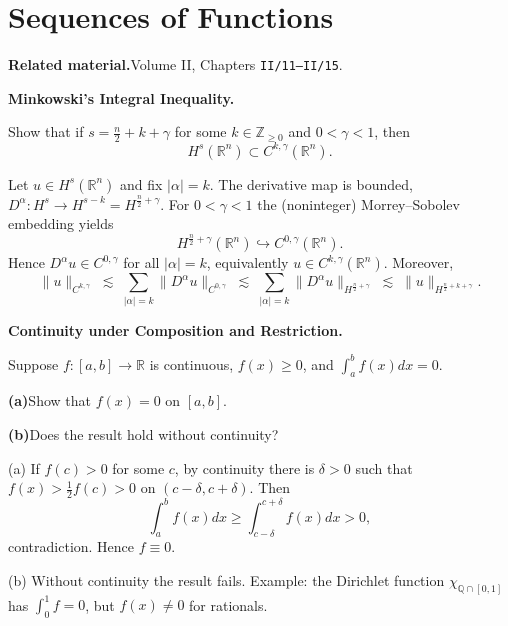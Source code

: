 \section{Sequences of Functions}

\par\medskip\noindent\textbf{Related material.}\quad  Volume II, Chapters \texttt{II/11--II/15}.

\begin{problem}[CP-II-0001]
\label{prob:cp-ii-0001}
\textbf{Minkowski's Integral Inequality.}

\hspace*{1.5em}Show that if $s=\frac n2+k+\gamma$ for some $k\in\mathbb Z_{\ge0}$ and $0<\gamma<1$, then
\[
H^s(\mathbb R^n)\subset C^{k,\gamma}(\mathbb R^n).
\]
\end{problem}

\begin{solution}
Let $u\in H^s(\mathbb R^n)$ and fix $|\alpha|=k$. The derivative map is bounded,
$D^\alpha:H^s\to H^{s-k}=H^{\frac n2+\gamma}$. For $0<\gamma<1$ the (noninteger) Morrey--Sobolev embedding yields
\[
H^{\frac n2+\gamma}(\mathbb R^n)\hookrightarrow C^{0,\gamma}(\mathbb R^n).
\]
Hence $D^\alpha u\in C^{0,\gamma}$ for all $|\alpha|=k$, equivalently $u\in C^{k,\gamma}(\mathbb R^n)$.
Moreover,
\[
\|u\|_{C^{k,\gamma}}\;\lesssim\;\sum_{|\alpha|=k}\|D^\alpha u\|_{C^{0,\gamma}}
\;\lesssim\;\sum_{|\alpha|=k}\|D^\alpha u\|_{H^{\frac n2+\gamma}}
\;\lesssim\;\|u\|_{H^{\frac n2+k+\gamma}}.
\]

\bigskip
\bigskip
\end{solution}

\begin{problem}[CP-II-0002]
\label{prob:cp-ii-0002}
\textbf{Continuity under Composition and Restriction.}

\hspace*{1.5em}Suppose $f:[a,b]\to\mathbb{R}$ is continuous, $f(x)\geq 0$, and $\int_a^b f(x)dx=0$.

	\par\smallskip\noindent\textbf{(a)}\quad Show that $f(x)=0$ on $[a,b]$.
	\par\smallskip\noindent\textbf{(b)}\quad Does the result hold without continuity?
\end{problem}

\begin{solution}
(a) If $f(c)>0$ for some $c$, by continuity there is $\delta>0$ such that $f(x)>\tfrac12 f(c)>0$ on $(c-\delta,c+\delta)$. Then
	\[
	\int_a^b f(x)dx\geq \int_{c-\delta}^{c+\delta} f(x)dx > 0,
	\]
	contradiction. Hence $f\equiv 0$.

	(b) Without continuity the result fails. Example: the Dirichlet function $\chi_{\mathbb{Q}\cap[0,1]}$ has $\int_0^1 f=0$, but $f(x)\neq 0$ for rationals.
\end{solution}

